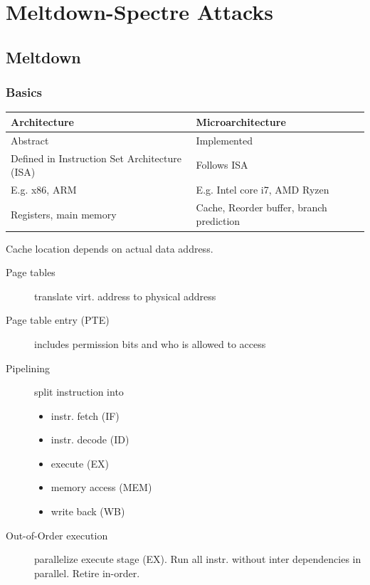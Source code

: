 \section{Meltdown-Spectre Attacks}
\subsection{Meltdown}
\subsubsection{Basics}
\begin{center}
  \begin{tabular}{|p{}|p{}|}
    \hline
    \textbf{Architecture} & \textbf{Microarchitecture}\\
    \hline
    \hline
    Abstract 	& Implemented\\
    \hline
    Defined in Instruction Set Architecture (ISA) & Follows ISA\\
    \hline
    E.g. x86, ARM & E.g. Intel core i7, AMD Ryzen\\
    \hline
    Registers, main memory & Cache, Reorder buffer, branch prediction \\
    \hline
  \end{tabular}
\end{center}

Cache location depends on actual data address.

\begin{description}
    \item[Page tables] translate virt. address to physical address
    \item[Page table entry (PTE)] includes permission bits and who is allowed to access
    \item[Pipelining] split instruction into
        \begin{itemize}
            \item instr. fetch (IF)
            \item instr. decode (ID)
            \item execute (EX)
            \item memory access (MEM)
            \item write back (WB)
        \end{itemize}
    \item[Out-of-Order execution] parallelize execute stage (EX). Run all instr. without inter dependencies in parallel. Retire in-order.
\end{description}


